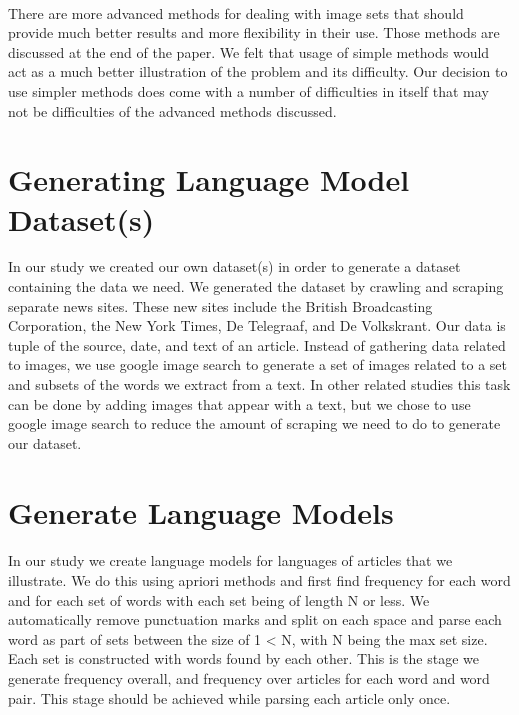 \documentclass[12pt]{article}
\begin{document}
\paragraph{}
There are more advanced methods for dealing with image sets that should provide much better
results and more flexibility in their use. Those methods are discussed at the end of the paper. 
We felt that usage of simple methods would act as a much better illustration of the problem and
its difficulty. Our decision to use simpler methods does come with a number of difficulties in
itself that may not be difficulties of the advanced methods discussed.

\section{Generating Language Model Dataset(s)}
In our study we created our own dataset(s) in order to generate a dataset containing the data we 
need. We generated the dataset by crawling and scraping separate news sites. These new sites 
include the British Broadcasting Corporation, the New York Times, De Telegraaf, and De Volkskrant. 
Our data is tuple of the source, date, and text of an article. Instead of gathering data related 
to images, we use google image search to generate a set of images related to a set and subsets of 
the words we extract from a text. In other related studies this task can be done by adding images 
that appear with a text, but we chose to use google image search to reduce the amount of scraping 
we need to do to generate our dataset.

\section{Generate Language Models}

\paragraph{}
In our study we create language models for languages of articles that we illustrate. We do this using 
apriori methods and first find frequency for each word and for each set of words with each set being 
of length N or less. We automatically remove punctuation marks and split on each space and parse each
word as part of sets between the size of 1 < N, with N being the max set size. Each set is constructed
with words found by each other. This is the stage we generate frequency overall, and frequency over 
articles for each word and word pair. This stage should be achieved while parsing each article only once.
\end{document}
